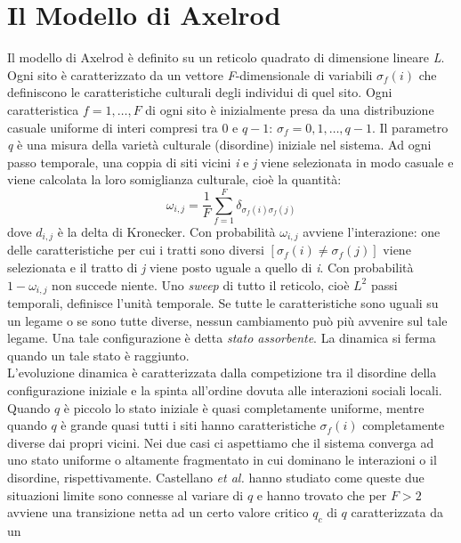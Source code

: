 \documentclass[a4paper,12pt]{article}
\begin{document}
\clearpage
\section{Il Modello di Axelrod}
Il modello di Axelrod \`{e} definito su un reticolo quadrato di dimensione lineare \textit{L}. 
Ogni sito \`{e} caratterizzato da un vettore \textit{F}-dimensionale di variabili $\sigma_f(i)$ che definiscono le caratteristiche culturali degli individui di quel sito.
Ogni caratteristica $f=1,\dots,F$ di ogni sito \`{e} inizialmente presa da una distribuzione casuale uniforme di interi compresi tra 0 e $q-1$: $\sigma_f = 0,1,\dots,q-1$.
Il parametro \textit{q} \`{e} una misura della variet\`{a} culturale (disordine) iniziale nel sistema.
Ad ogni passo temporale, una coppia di siti vicini \textit{i} e \textit{j} viene selezionata in modo casuale e viene calcolata la loro somiglianza culturale, cio\`{e} la quantit\`{a}:
\begin{equation}
 \omega_{i,j} = \frac{1}{F} \sum_{f=1}^F \delta_{\sigma_f(i) \sigma_f(j)}
\end{equation}
dove $d_{i,j}$ \`{e} la delta di Kronecker.
Con probabilit\`{a} $\omega_{i,j}$ avviene l'interazione: one delle caratteristiche per cui i tratti sono diversi 
$[ \sigma_f(i) \neq \sigma_f(j) ]$ viene selezionata e il tratto di \textit{j} viene posto uguale a quello di \textit{i}.
Con probabilit\`{a} $1-\omega_{i,j}$ non succede niente.
Uno \textit{sweep} di tutto il reticolo, cio\`{e} $L^2$ passi temporali, definisce l'unit\`{a} temporale.
Se tutte le caratteristiche sono uguali su un legame o se sono tutte diverse, nessun cambiamento pu\`{o} pi\`{u} avvenire sul tale legame.
Una tale configurazione \`{e} detta \textit{stato assorbente}. La dinamica si ferma quando un tale stato \`{e} raggiunto.
\\L'evoluzione dinamica \`{e} caratterizzata dalla competizione tra il disordine della configurazione iniziale e la spinta all'ordine
dovuta alle interazioni sociali locali. 
Quando $q$ \`{e} piccolo lo stato iniziale \`{e} quasi completamente uniforme, mentre quando $q$ \`{e} grande quasi tutti i siti
hanno caratteristiche $\sigma_f(i)$ completamente diverse dai propri vicini. Nei due casi ci aspettiamo che il sistema converga ad
uno stato uniforme o altamente fragmentato in cui dominano le interazioni o il disordine, rispettivamente.
Castellano \textit{et al.} \cite{Castellano} hanno studiato come queste due situazioni limite sono connesse al variare di $q$
e hanno trovato che per $F>2$ avviene una transizione netta ad un certo valore critico $q_c$ di $q$ caratterizzata da un
\end{document}
